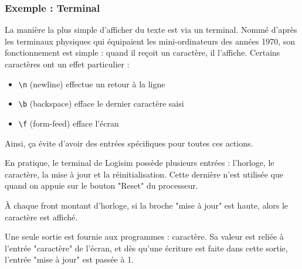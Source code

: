 \documentclass{article}
\begin{document}
    \subsubsection{Exemple : Terminal}
    
    La manière la plus simple d'afficher du texte est via un terminal. Nommé d'après les terminaux physiques qui équipaient les mini-ordinateurs des années 1970, son fonctionnement est simple : quand il reçoit un caractère, il l'affiche. Certains caractères ont un effet particulier :
    \begin{itemize}
    	\item \texttt{\textbackslash n} (newline) effectue un retour à la ligne
    	\item \texttt{\textbackslash b} (backspace) efface le dernier caractère saisi
    	\item \texttt{\textbackslash f} (form-feed) efface l'écran
    \end{itemize}
    Ainsi, ça évite d'avoir des entrées spécifiques pour toutes ces actions.
    
    En pratique, le terminal de Logisim possède plusieurs entrées : l'horloge, le caractère, la mise à jour et la réinitialisation. Cette dernière n'est utilisée que quand on appuie sur le bouton "Reset" du processeur.
    
    À chaque front montant d'horloge, si la broche "mise à jour" est haute, alors le caractère est affiché.
    
    Une seule sortie est fournie aux programmes : caractère. Sa valeur est reliée à l'entrée "caractère" de l'écran, et dès qu'une écriture est faite dans cette sortie, l'entrée "mise à jour" est passée à 1.
    
\end{document}

